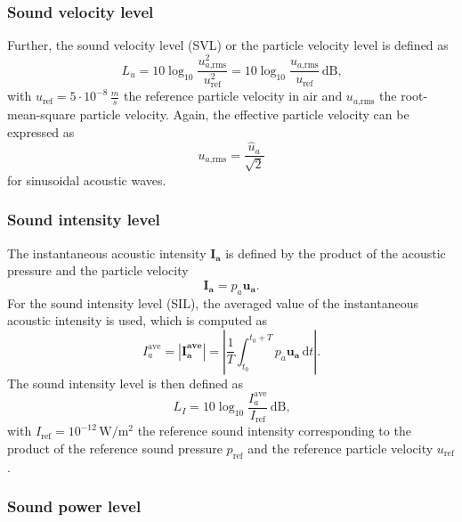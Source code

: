 \subsubsection*{Sound velocity level}
Further, the sound velocity level (SVL) or the particle velocity level is defined as
\begin{equation}
	L_u = 10\log_{10}\frac{u_{a\text{,rms}}^2}{u_\text{ref}^2} = 10\log_{10}\frac{u_{a\text{,rms}}}{u_\text{ref}}\,\text{dB}\text{,} 
\end{equation}
with $u_\text{ref} = 5\cdot10^{-8}\,\frac{m}{s}$ the reference particle velocity in air and $u_{a\text{,rms}}$ the root-mean-square particle velocity. Again, the effective particle velocity can be expressed as
\begin{equation}
	u_{a\text{,rms}} = \frac{\hat{u}_a}{\sqrt{2}}
\end{equation}
for sinusoidal acoustic waves.

\subsubsection*{Sound intensity level}

The instantaneous acoustic intensity $\boldsymbol{I_a}$ is defined by the product of the acoustic pressure and the particle velocity
\begin{equation}
	\boldsymbol{I_a} = p_a \boldsymbol{u_a}\text{.}
\end{equation} 
For the sound intensity level (SIL), the averaged value of the instantaneous acoustic intensity is used, which is computed as
\begin{equation}
	I_a^{\text{ave}} = |\boldsymbol{I_a^{\text{ave}}}| = \left|\frac{1}{T}\int_{t_0}^{t_0 + T} p_a \boldsymbol{u_a}\,\text{d}t\right|\text{.}
\end{equation}
The sound intensity level is then defined as
\begin{equation}
	L_I = 10\log_{10}\frac{I_a^{\text{ave}}}{I_\text{ref}}\,\text{dB}\text{,}
\end{equation}
with $I_\text{ref} = 10^{-12}\,\text{W/}\text{m}^2$ the reference sound intensity corresponding to the product of the reference sound pressure $p_\text{ref}$ and the reference particle velocity $u_\text{ref}$.

\subsubsection*{Sound power level}

